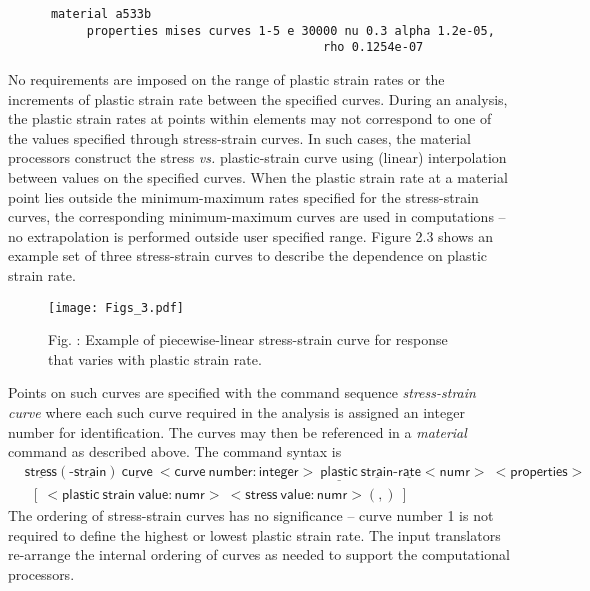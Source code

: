 \documentclass[11pt]{report}
\numberwithin{equation}{section}
\newcommand{\nin} {\noindent}
\newcommand{\ul} {\underline}
\newcommand{\hv} {\mathsf}   %
\newcommand{\ti}{\emph}
\begin{document}
\small \begin{verbatim}
      material a533b
           properties mises curves 1-5 e 30000 nu 0.3 alpha 1.2e-05,
                                            rho 0.1254e-07
\end{verbatim} \normalsize

No requirements are imposed on the range of plastic strain rates or the
increments of plastic strain rate between the specified curves. During an
analysis, the plastic strain rates at points within elements may not correspond
to one of the values specified through stress-strain curves. In such cases, the
material processors construct the stress \ti{vs.} plastic-strain curve
using (linear) interpolation between values on the specified curves. When the
plastic strain rate at a material point lies outside the minimum-maximum rates
specified for the stress-strain curves, the corresponding minimum-maximum curves
are used in computations -- no extrapolation is performed outside user
specified range. Figure 2.3 shows an example set of three stress-strain curves
to describe the dependence on plastic strain rate.
%
\begin{figure}[tb]
\begin{center}
\texttt{[image: Figs\_3.pdf]} 
\caption{{\small Fig. \thefigure: Example of piecewise-linear stress-strain 
curve for response that varies with plastic strain rate.\normalsize}
\label{fig:fig2}}
%
\end{center}
\end{figure}
%

Points on such curves are specified with the command sequence \ti{stress-strain
curve} where each such curve required in the analysis is assigned an integer
number for identification. The curves may then be referenced in a \ti{material}
command as described above. The command syntax is
\begin{align*}
&\hv{\ul{stress}(\mbox{-}\ul{strain})\ \ul{curve}\ <curve\ number:integer>\ 
\ul{plastic}\ \ul{strain}\mbox{-}\ul{rate} <numr>\ <properties>} \\
&\hv{\ \ [\ <plastic\ strain\ value:numr>\ <stress\ value:numr> (,) \ ]}
\end{align*}\normalsize
\nin The ordering of stress-strain curves has no significance -- curve number 1
is not required to define the highest or lowest plastic strain rate. The input
translators re-arrange the internal ordering of curves as needed to support the
computational processors.
\end{document}
